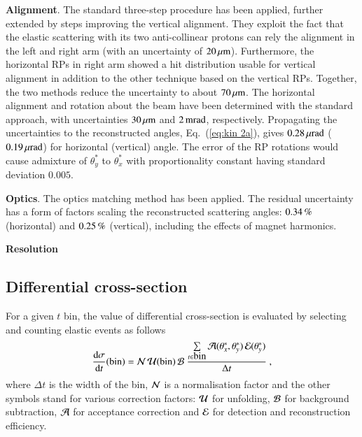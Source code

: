 {\bf Alignment}. The standard three-step procedure \cite{totem-ijmp} has been applied, further extended by steps improving the vertical alignment. They exploit the fact that the elastic scattering with its two anti-collinear protons can rely the alignment in the left and right arm (with an uncertainty of $20\,{\rm \mu m}$). Furthermore, the horizontal RPs in right arm showed a hit distribution usable for vertical alignment in addition to the other technique based on the vertical RPs. Together, the two methods reduce the uncertainty to about $70\,{\rm \mu m}$. The horizontal alignment and rotation about the beam have been determined with the standard approach, with uncertainties $30\,{\rm \mu m}$ and $2\,{\rm m rad}$, respectively. Propagating the uncertainties to the reconstructed angles, Eq.~(\ref{eq:kin 2a}), gives $0.28\,{\rm \mu rad}$ ($0.19\,{\rm \mu rad}$) for horizontal (vertical) angle. The error of the RP rotations would cause admixture of $\theta_y^*$ to $\theta_x^*$ with proportionality constant having standard deviation $0.005$.


{\bf Optics}. The optics matching method \cite{totem-optics} has been applied. The residual uncertainty has a form of factors scaling the reconstructed scattering angles:
$0.34\,{\rm \%}$ (horizontal) and $0.25\,{\rm \%}$ (vertical), including the effects of magnet harmonics.



{\bf Resolution}


\subsection{Differential cross-section}

For a given $t$ bin, the value of differential cross-section is evaluated by selecting and counting elastic events as follows
\begin{equation}
{\d\sigma\over \d t}(\hbox{bin}) =
	{\cal N}\, {\cal U}({\rm bin})\, {\cal B}\ 
	{\sum\limits_{t \in \hbox{bin}} {\cal A}(\theta_x^*, \theta_y^*)\, {\cal E}(\theta_y^*)\over \Delta t}\ ,
\end{equation}
where $\Delta t$ is the width of the bin, ${\cal N}$ is a normalisation factor and the other symbols stand for various correction factors:
 ${\cal U}$ for unfolding, ${\cal B}$ for background subtraction, ${\cal A}$ for acceptance correction and ${\cal E}$ for detection and reconstruction efficiency.


